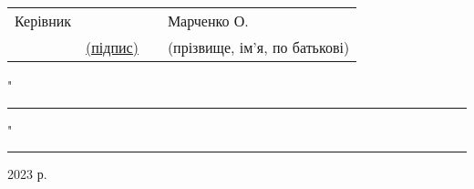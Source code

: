 \documentclass[14pt]{article}
\begin{document}
\begin{flushleft}
\vspace{1cm}
\begin{tabularx}{1.15\textwidth}{p{4.5cm} p{2cm} Y Y}
\centering Керівник &&& Марченко О.\\
& \fontsize{8}{11}\selectfont \centering \underline{(підпис)} && \fontsize{8}{11}\selectfont \centering (прізвище, ім’я, по батькові)\\
\end{tabularx}
\end{flushleft}

"\rule{1cm}{0.15mm}" \rule{4cm}{0.15mm} 2023 р.

\pagebreak
\end{document}
